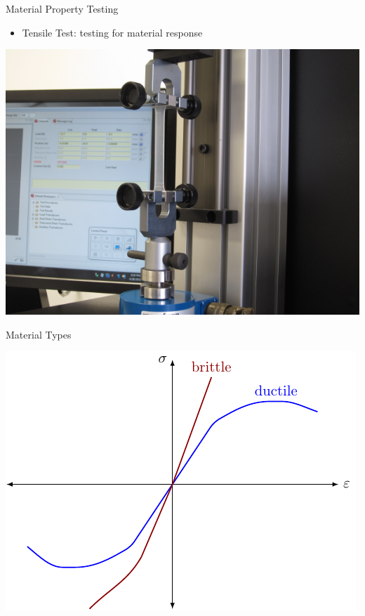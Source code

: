 \documentclass[10pt, svgnames]{beamer}
\begin{document}
\begin{frame}[label={sec:org365bedb}]{Material Property Testing}
\begin{itemize}
\item Tensile Test: testing for material response
\end{itemize}

\begin{center}
\includegraphics[height=0.6\textheight]{./pictures/tensile-test-with-quattro.png}
\end{center}
\end{frame}

\begin{frame}[label={sec:org825d46b}]{Material Types}
\begin{center}
\includegraphics[height=0.6\textheight]{pictures/material-type-behavior.pdf}
\end{center}
\end{frame}
\end{document}
